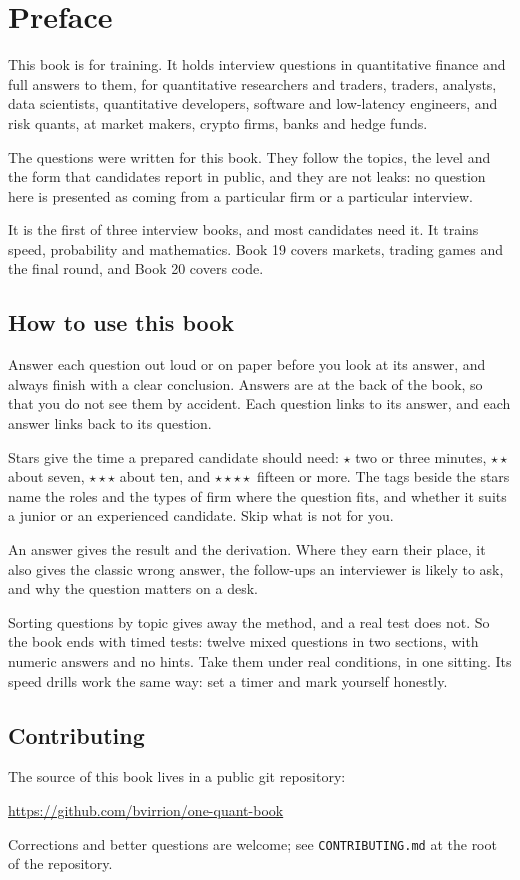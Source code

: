 \chapter{Preface}

This book is for training. It holds interview questions in quantitative finance and full answers to them, for
quantitative researchers and traders, traders, analysts, data scientists, quantitative developers, software and
low-latency engineers, and risk quants, at market makers, crypto firms, banks and hedge funds.

The questions were written for this book. They follow the topics, the level and the form that candidates report in
public, and they are not leaks: no question here is presented as coming from a particular firm or a particular
interview.

It is the first of three interview books, and most candidates need it. It trains speed, probability and
mathematics. Book 19 covers markets, trading games and the final round, and Book 20 covers code.

\section*{How to use this book}

Answer each question out loud or on paper before you look at its answer, and always finish with a clear conclusion.
Answers are at the back of the book, so that you do not see them by accident. Each question links to its answer, and
each answer links back to its question.

Stars give the time a prepared candidate should need: $\star$ two or three minutes, $\star\star$ about seven,
$\star\star\star$ about ten, and $\star\star\star\star$ fifteen or more. The tags beside the stars name the roles and
the types of firm where the question fits, and whether it suits a junior or an experienced candidate. Skip what is not
for you.

An answer gives the result and the derivation. Where they earn their place, it also gives the classic wrong answer, the
follow-ups an interviewer is likely to ask, and why the question matters on a desk.

Sorting questions by topic gives away the method, and a real test does not. So the book ends with timed tests: twelve
mixed questions in two sections, with numeric answers and no hints. Take them under real conditions, in one sitting.
Its speed drills work the same way: set a timer and mark yourself honestly.


\section*{Contributing}

The source of this book lives in a public git repository:
\begin{center}
\url{https://github.com/bvirrion/one-quant-book}
\end{center}
Corrections and better questions are welcome; see \texttt{CONTRIBUTING.md} at the root of the repository.
